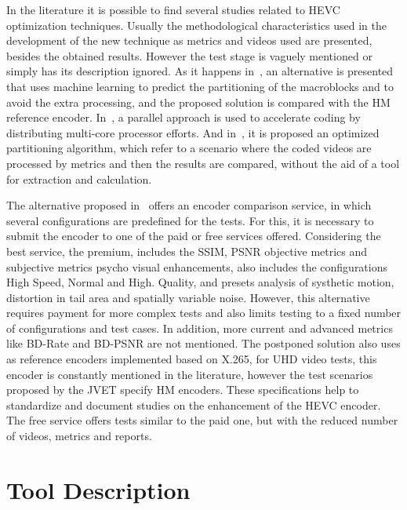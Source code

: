 \documentclass[journal]{IEEEtran}
\begin{document}
In the literature it is possible to find several studies related to HEVC optimization techniques. Usually the methodological characteristics used in the development of the new technique as metrics and videos used are presented, besides the obtained results. However the test stage is vaguely mentioned or simply has its description ignored. As it happens in~\cite{oliveira:16}, an alternative is presented that uses machine learning to predict the partitioning of the macroblocks and to avoid the extra processing, and the proposed solution is compared with the HM reference encoder. In~\cite{Wang:16}, a parallel approach is used to accelerate coding by distributing multi-core processor efforts. And in~\cite{wang:13}, it is proposed an optimized partitioning algorithm, which refer to a scenario where the coded videos are processed by metrics and then the results are compared, without the aid of a tool for extraction and calculation.

The alternative proposed in~\cite{msu:16} offers an encoder comparison service, in which several configurations are predefined for the tests. For this, it is necessary to submit the encoder to one of the paid or free services offered. Considering the best service, the premium, includes the SSIM, PSNR objective metrics and subjective metrics psycho visual enhancements, also includes the configurations High Speed, Normal and High. Quality, and presets analysis of systhetic motion, distortion in tail area and spatially variable noise. However, this alternative requires payment for more complex tests and also limits testing to a fixed number of configurations and test cases. In addition, more current and advanced metrics like BD-Rate and BD-PSNR are not mentioned. The postponed solution also uses as reference encoders implemented based on X.265, for UHD video tests, this encoder is constantly mentioned in the literature, however the test scenarios proposed by the JVET specify HM encoders. These specifications help to standardize and document studies on the enhancement of the HEVC encoder. The free service offers tests similar to the paid one, but with the reduced number of videos, metrics and reports.



\section{Tool Description}
\end{document}
